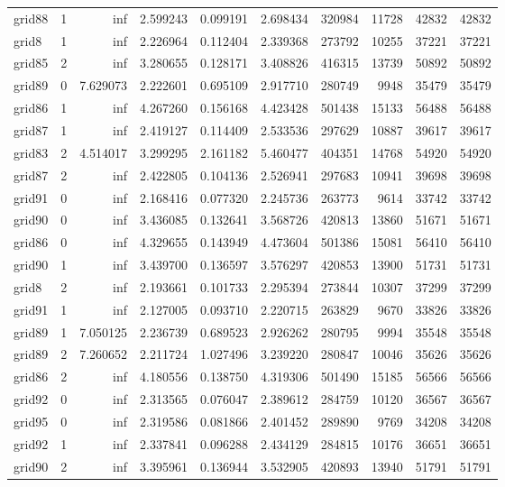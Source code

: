 \begin{longtable}{|l|r|r|r|r|r|r|r|r|r|}
grid88 & 1 & inf & 2.599243 & 0.099191 & 2.698434 & 320984 & 11728 & 42832 & 42832 \\
grid8 & 1 & inf & 2.226964 & 0.112404 & 2.339368 & 273792 & 10255 & 37221 & 37221 \\
grid85 & 2 & inf & 3.280655 & 0.128171 & 3.408826 & 416315 & 13739 & 50892 & 50892 \\
grid89 & 0 & 7.629073 & 2.222601 & 0.695109 & 2.917710 & 280749 & 9948 & 35479 & 35479 \\
grid86 & 1 & inf & 4.267260 & 0.156168 & 4.423428 & 501438 & 15133 & 56488 & 56488 \\
grid87 & 1 & inf & 2.419127 & 0.114409 & 2.533536 & 297629 & 10887 & 39617 & 39617 \\
grid83 & 2 & 4.514017 & 3.299295 & 2.161182 & 5.460477 & 404351 & 14768 & 54920 & 54920 \\
grid87 & 2 & inf & 2.422805 & 0.104136 & 2.526941 & 297683 & 10941 & 39698 & 39698 \\
grid91 & 0 & inf & 2.168416 & 0.077320 & 2.245736 & 263773 & 9614 & 33742 & 33742 \\
grid90 & 0 & inf & 3.436085 & 0.132641 & 3.568726 & 420813 & 13860 & 51671 & 51671 \\
grid86 & 0 & inf & 4.329655 & 0.143949 & 4.473604 & 501386 & 15081 & 56410 & 56410 \\
grid90 & 1 & inf & 3.439700 & 0.136597 & 3.576297 & 420853 & 13900 & 51731 & 51731 \\
grid8 & 2 & inf & 2.193661 & 0.101733 & 2.295394 & 273844 & 10307 & 37299 & 37299 \\
grid91 & 1 & inf & 2.127005 & 0.093710 & 2.220715 & 263829 & 9670 & 33826 & 33826 \\
grid89 & 1 & 7.050125 & 2.236739 & 0.689523 & 2.926262 & 280795 & 9994 & 35548 & 35548 \\
grid89 & 2 & 7.260652 & 2.211724 & 1.027496 & 3.239220 & 280847 & 10046 & 35626 & 35626 \\
grid86 & 2 & inf & 4.180556 & 0.138750 & 4.319306 & 501490 & 15185 & 56566 & 56566 \\
grid92 & 0 & inf & 2.313565 & 0.076047 & 2.389612 & 284759 & 10120 & 36567 & 36567 \\
grid95 & 0 & inf & 2.319586 & 0.081866 & 2.401452 & 289890 & 9769 & 34208 & 34208 \\
grid92 & 1 & inf & 2.337841 & 0.096288 & 2.434129 & 284815 & 10176 & 36651 & 36651 \\
grid90 & 2 & inf & 3.395961 & 0.136944 & 3.532905 & 420893 & 13940 & 51791 & 51791 \\

\end{longtable}
